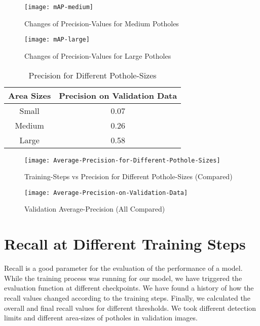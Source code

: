             \begin{figure}[h]
                \centering
                \texttt{[image: mAP-medium]}
                \caption{Changes of Precision-Values for Medium Potholes}
                \label{fig:precision_sizes_medium}
            \end{figure}
            
            \begin{figure}
                \centering
                \texttt{[image: mAP-large]}
                \caption{Changes of Precision-Values for Large Potholes}
                \label{fig:precision_sizes_large}
            \end{figure}
            
            \begin{table}
                \centering
                \begin{tabular}{|c||c|} \hline 
                     Area Sizes  &  Precision on Validation Data \\\hline\hline
                     Small  &  0.07 \\\hline
                     Medium  &  0.26 \\\hline
                     Large  &  0.58 \\\hline
                \end{tabular}
                \caption{Precision for Different Pothole-Sizes}
                \label{tab:precision_sizes}
            \end{table}
            
            \clearpage
            \begin{figure}
                \centering
                \texttt{[image: Average-Precision-for-Different-Pothole-Sizes]}
                \caption{Training-Steps vs Precision for Different Pothole-Sizes (Compared)}
                \label{fig:precision_sizes}
            \end{figure}
            
            \begin{figure}
                \centering
                \texttt{[image: Average-Precision-on-Validation-Data]}
                \caption{Validation Average-Precision (All Compared)}
                \label{fig:precisions}
            \end{figure}
            
    \clearpage
    \section{Recall at Different Training Steps}
        Recall is a good parameter for the evaluation of the performance of a model. While the training process was running for our model, we have triggered the evaluation function at different checkpoints. We have found a history of how the recall values changed according to the training steps. Finally, we calculated the overall and final recall values for different thresholds. We took different detection limits and different area-sizes of potholes in validation images.
        

